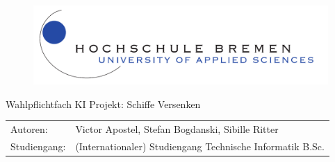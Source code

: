 %
%
%
%
%
\begin{titlepage}
	\begin{figure}[lt] %
		\includegraphics[scale=0.5]{images/logo_a4.pdf}
	\end{figure}
	\begin{center}
		\Huge
		Wahlpflichtfach KI \newline
		\hspace{1cm}
		\Large
		Projekt: Schiffe Versenken
	\end{center}	
	\vfill
	\begin{table}[H] %
		\centering
		\begin{tabular}{ll}
			Autoren: & Victor Apostel, Stefan Bogdanski, Sibille Ritter \\
			Studiengang: & (Internationaler) Studiengang Technische Informatik B.Sc. \\
		\end{tabular}
		\label{label}
	\end{table}
\end{titlepage}